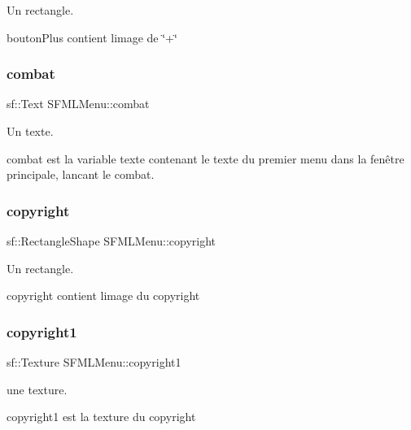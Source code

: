 Un rectangle. 

bouton\+Plus contient l\textquotesingle{}image de \char`\"{}+\char`\"{} \mbox{\label{class_s_f_m_l_menu_a39c1b4490f17be2d3c367397d08df53e}} 
\subsubsection{\texorpdfstring{combat}{combat}}
{\footnotesize\ttfamily sf\+::\+Text S\+F\+M\+L\+Menu\+::combat\hspace{0.3cm}{\ttfamily [private]}}



Un texte. 

combat est la variable texte contenant le texte du premier menu dans la fenêtre principale, lancant le combat. \mbox{\label{class_s_f_m_l_menu_a8d2296e13ee5bf905a387e5a4565b29e}} 
\subsubsection{\texorpdfstring{copyright}{copyright}}
{\footnotesize\ttfamily sf\+::\+Rectangle\+Shape S\+F\+M\+L\+Menu\+::copyright\hspace{0.3cm}{\ttfamily [private]}}



Un rectangle. 

copyright contient l\textquotesingle{}image du copyright \mbox{\label{class_s_f_m_l_menu_a367d55e31607d74642668d343a16b338}} 
\subsubsection{\texorpdfstring{copyright1}{copyright1}}
{\footnotesize\ttfamily sf\+::\+Texture S\+F\+M\+L\+Menu\+::copyright1\hspace{0.3cm}{\ttfamily [private]}}



une texture. 

copyright1 est la texture du copyright \mbox{\label{class_s_f_m_l_menu_ab363a837f8b4f25245e873cd8e87f840}} 
